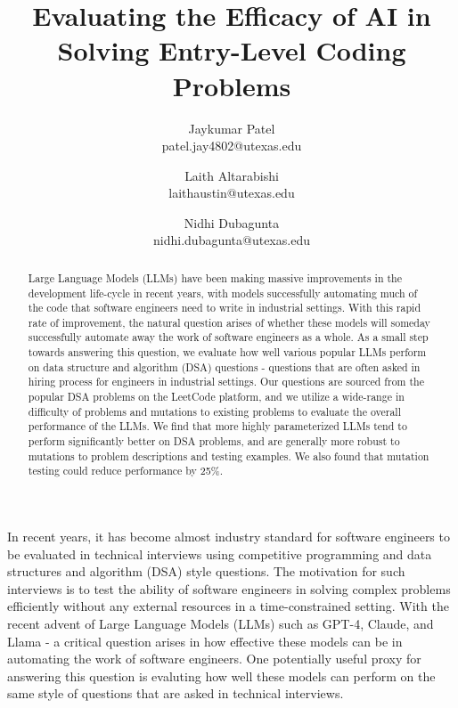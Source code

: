 \documentclass[times, 10pt,twocolumn]{article}
\begin{document}
\title{Evaluating the Efficacy of AI in Solving Entry-Level Coding Problems}

\author{Jaykumar Patel\\
patel.jay4802@utexas.edu\\
\and
Laith Altarabishi\\
laithaustin@utexas.edu\\
\and
Nidhi Dubagunta\\
nidhi.dubagunta@utexas.edu\\
}

\maketitle
\thispagestyle{empty}

\begin{abstract}
Large Language Models (LLMs) have been making massive improvements in the development life-cycle in recent years, with models successfully automating much of the code that software engineers need to write in industrial settings. With this rapid rate of improvement, the natural question arises of whether these models will someday successfully automate away the work of software engineers as a whole. As a small step towards answering this question, we evaluate how well various popular LLMs perform on data structure and algorithm (DSA) questions - questions that are often asked in hiring process for engineers in industrial settings. Our questions are sourced from the popular DSA problems on the LeetCode platform, and we utilize a wide-range in difficulty of problems and mutations to existing problems to evaluate the overall performance of the LLMs. We find that more highly parameterized LLMs tend to perform significantly better on DSA problems, and are generally more robust to mutations to problem descriptions and testing examples. We also found that mutation testing could reduce performance by 25\%.
\end{abstract}


In recent years, it has become almost industry standard for software engineers to be evaluated in technical interviews using competitive programming and data structures and algorithm (DSA) style questions. The motivation for such interviews is to test the ability of software engineers in solving complex problems efficiently without any external resources in a time-constrained setting. With the recent advent of Large Language Models (LLMs) such as GPT-4, Claude, and Llama - a critical question arises in how effective these models can be in automating the work of software engineers. One potentially useful proxy for answering this question is evaluting how well these models can perform on the same style of questions that are asked in technical interviews.
\end{document}
